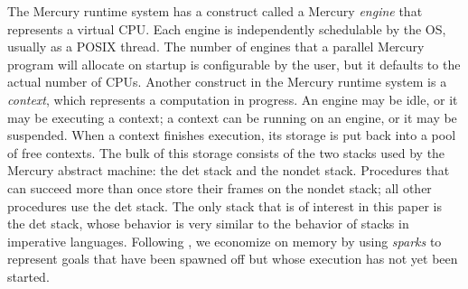 The Mercury runtime system has a construct called a Mercury \emph{engine}
that represents a virtual CPU.
Each engine is independently schedulable by the OS, usually as a POSIX thread.
The number of engines that a parallel Mercury program will allocate on startup
is configurable by the user,
but it defaults to the actual number of CPUs.
Another construct in the Mercury runtime system is a \emph{context},
which represents a computation in progress.
An engine may be idle, or it may be executing a context;
a context can be running on an engine, or it may be suspended.
When a context finishes execution,
its storage is put back into a pool of free contexts.
The bulk of this storage consists
of the two stacks used by the Mercury abstract machine:
the det stack and the nondet stack.
Procedures that can succeed more than once
store their frames on the nondet stack;
all other procedures use the det stack.
The only stack that is of interest in this paper is the det stack,
whose behavior is very similar
to the behavior of stacks in imperative languages.
Following \cite{simonmar_2009_multicore_rts},
we economize on memory by using \emph{sparks}
to represent goals that have been spawned off
but whose execution has not yet been started.

